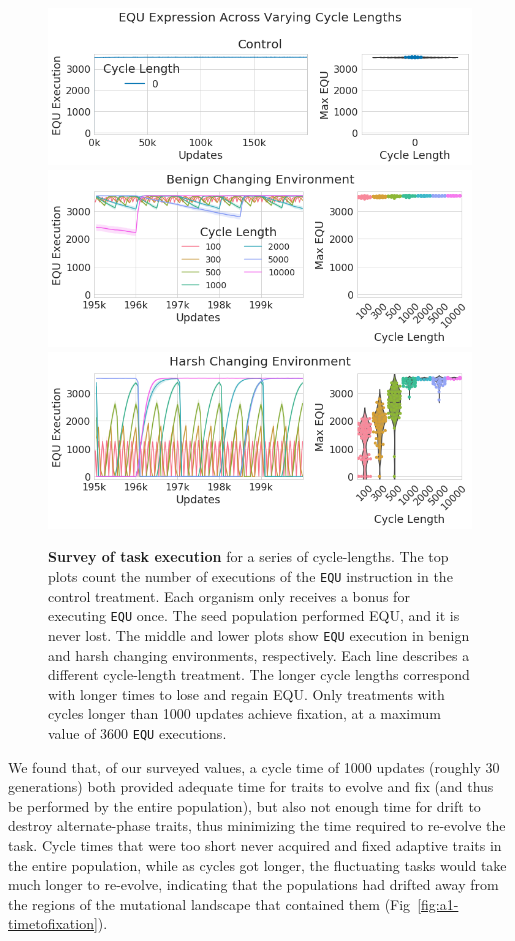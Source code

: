 \documentclass[PhD]{msu-thesis}
\begin{document}
\begin{appendices}
\begin{figure}[!h]
	\includegraphics[width=0.85\columnwidth]{figures/A1/a1-taskexpression-control.png}
	\includegraphics[width=0.85\columnwidth]{figures/A1/a1-taskexpression-benign.png}
	\includegraphics[width=0.85\columnwidth]{figures/A1/a1-taskexpression-harsh.png}
	\caption{\textbf{Survey of task execution} for a series of cycle-lengths. The top plots count the number of executions of the \texttt{EQU} instruction in the control treatment. Each organism only receives a bonus for executing \texttt{EQU} once. The seed population performed EQU, and it is never lost. The middle and lower plots show \texttt{EQU} execution in benign and harsh changing environments, respectively. Each line describes a different cycle-length treatment. The longer cycle lengths correspond with longer times to lose and regain EQU. Only treatments with cycles longer than 1000 updates achieve fixation, at a maximum value of 3600 \texttt{EQU} executions. %
	}
	\label{fig:a1-taskexpression}
	\end{figure}

We found that, of our surveyed values, a cycle time of 1000 updates (roughly 30 generations) both provided adequate time for traits to evolve and fix (and thus be performed by the entire population), but also not enough time for drift to destroy alternate-phase traits, thus minimizing the time required to re-evolve the task. Cycle times that were too short never acquired and fixed adaptive traits in the entire population, while as cycles got longer, the fluctuating tasks would take much longer to re-evolve, indicating that the populations had drifted away from the regions of the mutational landscape that contained them (Fig~\ref{fig:a1-timetofixation}). 


\end{appendices}
\end{document}
